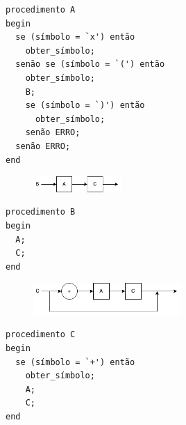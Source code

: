 \documentclass{article}
\begin{document}
\begin{verbatim}
procedimento A
begin
  se (símbolo = `x') então
    obter_símbolo;
  senão se (símbolo = `(') então
    obter_símbolo;
    B;
    se (símbolo = `)') então
      obter_símbolo;
    senão ERRO;
  senão ERRO;
end
\end{verbatim}

\begin{figure}[ht!]
    \centering
    \includegraphics[width=0.3\textwidth]{ex5/B.png}
\end{figure}

\begin{verbatim}
procedimento B
begin
  A;
  C;
end
\end{verbatim}

\begin{figure}[ht!]
    \centering
    \includegraphics[width=0.5\textwidth]{ex5/C.png}
\end{figure}

\begin{verbatim}
procedimento C
begin
  se (símbolo = `+') então
    obter_símbolo;
    A;
    C;
end
\end{verbatim}
\end{document}
